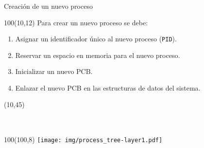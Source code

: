 \documentclass[aspectratio=169]{beamer}
\begin{document}
\begin{frame}{Creación de un nuevo proceso}
    \begin{textblock}{100}(10,12)
    \small
    Para crear un nuevo proceso se debe:
    \begin{enumerate}
    \item<1-> Asignar un identificador único al nuevo proceso (\texttt{PID}).
    \item<2-> Reservar un espacio en memoria para el nuevo proceso.
    \item<3-> Inicializar un nuevo PCB.
    \item<4-> Enlazar el nuevo PCB en las estructuras de datos del sistema.
    \end{enumerate}
    \end{textblock}
    \begin{textblock}{80}(10,45)
    \small
    \\
    \medskip
    \\
    \medskip
    \\
    \medskip
    \end{textblock}
    \begin{textblock}{100}(100,8) \texttt{[image: img/process\_tree-layer1.pdf]} \end{textblock}
\end{frame}
\end{document}
